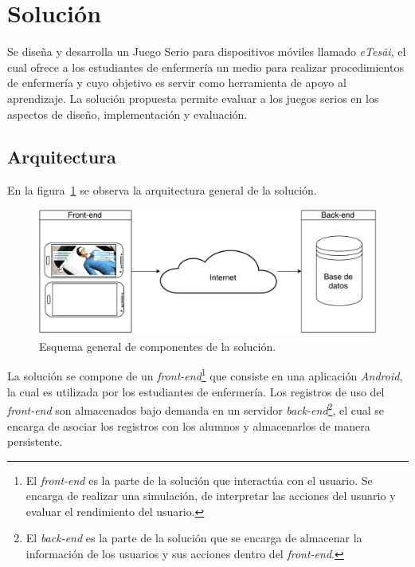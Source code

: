 
\section{Solución}


Se diseña y desarrolla un Juego Serio para dispositivos móviles llamado
\textit{eTes\~{a}i}, el cual ofrece a los estudiantes de enfermería un medio para
realizar procedimientos de enfermería y cuyo objetivo es servir como herramienta
de apoyo al aprendizaje. La solución propuesta permite evaluar a los juegos
serios en los aspectos de diseño, implementación y evaluación.


\subsection{Arquitectura}

En la figura~\ref{fig:full_architecture} se observa la arquitectura general de la 
solución.

\begin{figure}[H]
\centering
\includegraphics[scale=0.29]{../tecnologias/images/full.pdf}
\caption{Esquema general de componentes de la solución.}
\label{fig:full_architecture}
\end{figure}

La solución se compone de un \textit{front-end}\footnote{El \textit{front-end}
    es la parte de la solución que interactúa con el usuario. Se encarga de
    realizar una simulación, de interpretar las acciones del usuario y evaluar
    el rendimiento del usuario.} que consiste en una aplicación \textit{Android}, la cual
es utilizada por los estudiantes de enfermería. Los registros de uso del
\textit{front-end} son almacenados bajo demanda en un servidor
\textit{back-end}\footnote{El \textit{back-end} es la parte de la solución que
    se encarga de almacenar la información de los usuarios y sus acciones dentro
    del \textit{front-end}.}, el cual se encarga de asociar los registros con
los alumnos y almacenarlos de manera persistente.

